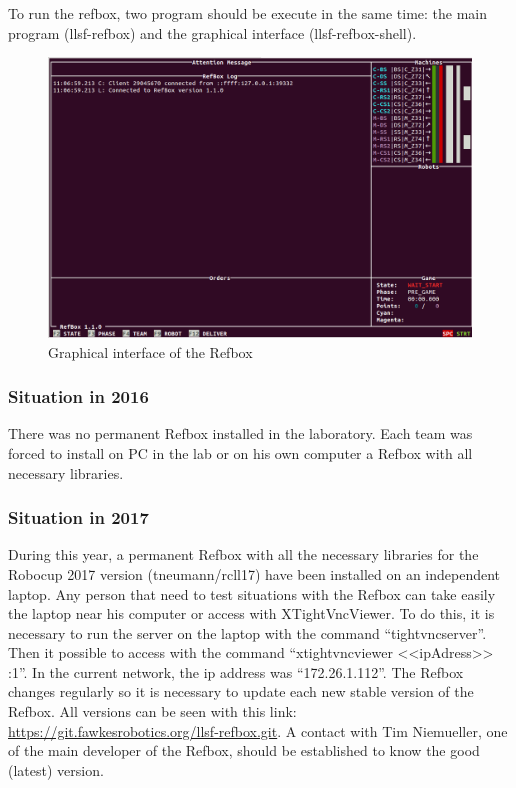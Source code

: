 To run the refbox, two program should be execute in the same time: the main program (llsf-refbox) and the graphical interface (llsf-refbox-shell).

\begin{figure}[!h]
\centering
\includegraphics[width=\linewidth]{pic/graphical_refbox.png}
\caption{Graphical interface of the Refbox}
\label{fig:refb}
\end{figure}

\subsubsection{Situation in 2016}

There was no permanent Refbox installed in the laboratory. Each team was forced to install on PC in the lab or on his own computer a Refbox with all necessary libraries. \\


\subsubsection{Situation in 2017}

During this year, a permanent Refbox with all the necessary libraries for the Robocup 2017 version (tneumann/rcll17) have been installed on an independent laptop. Any person that need to test situations with the Refbox can take easily the laptop near his computer or access with XTightVncViewer.  To do this, it is necessary to run the server on the laptop with the command “tightvncserver”. Then it possible to access with the command “xtightvncviewer <<ipAdress>> :1”.  In the current network, the ip address was “172.26.1.112”. The Refbox changes regularly so it is necessary to update each new stable version of the Refbox. All versions can be seen with this link: \url{https://git.fawkesrobotics.org/llsf-refbox.git}. A contact with Tim Niemueller, one of the main developer of the Refbox, should be established to know the good (latest) version. \\

